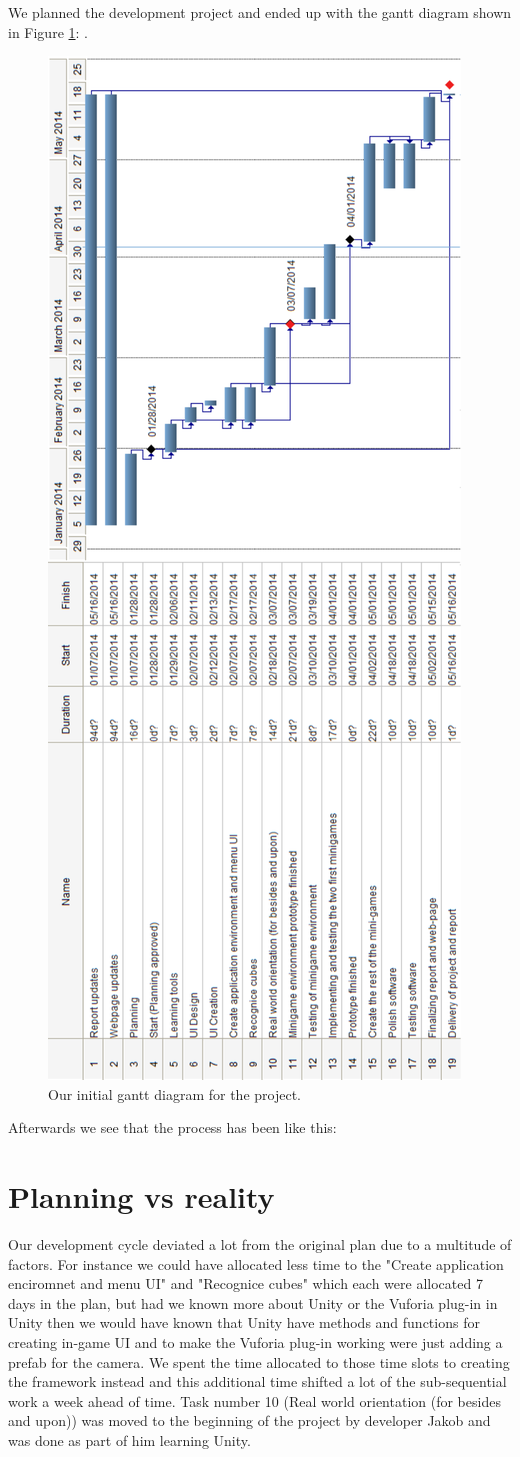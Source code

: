 We planned the development project and ended up with the gantt diagram shown in Figure \ref{fig:preplan_gantt}: .

\begin{figure}[ht]
	\capstart
	\centering
	\includegraphics[height=\textwidth, angle=270]{preplan_gantt_diagram}
	\caption[Preplan Gantt diagram]{Our initial gantt diagram for the project.}	\label{fig:preplan_gantt}
\end{figure}


Afterwards we see that the process has been like this:


\section{Planning vs reality}%
Our development cycle deviated a lot from the original plan due to a multitude of factors.
For instance we could have allocated less time to the "Create application enciromnet and menu UI" and "Recognice cubes" which each were allocated 7 days in the plan, but had we known more about Unity or the Vuforia plug-in in Unity then we would have known that Unity have methods and functions for creating in-game UI and to make the Vuforia plug-in working were just adding a \gls{prefab} for the camera.
We spent the time allocated to those time slots to creating the framework instead and this additional time shifted a lot of the sub-sequential work a week ahead of time.
Task number 10 (Real world orientation (for besides and upon)) was moved to the beginning of the project by developer Jakob and was done as part of him learning Unity.

